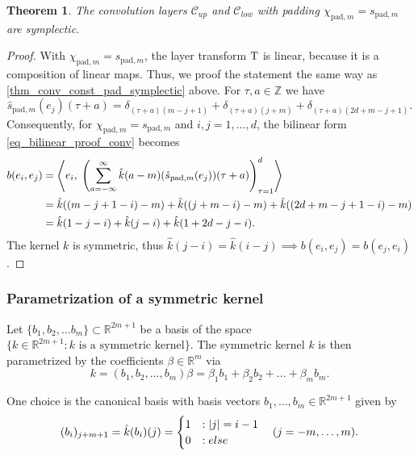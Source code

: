 \documentclass[twoside,a4paper]{article}
\newtheorem{theorem}{Theorem}
\begin{document}
\begin{theorem}
	The convolution layers $\mathcal{C}_{up}$ and $\mathcal{C}_{low}$
	with padding $\chi_{\text{pad},m} = s_{\text{pad},m}$ are symplectic.
\end{theorem}
\begin{proof}
	With $\chi_{\text{pad},m} = s_{\text{pad},m}$, the layer transform 
	$\mathrm{T}$ is linear, because it is a composition of linear maps. Thus,
	we proof the statement the same way as \cref{thm_conv_const_pad_symplectic} above.
	For $\tau,a \in \mathbb{Z}$ we have
	\begin{equation*}
		\hat{s}_{\text{pad},m}(e_j)(\tau + a) = 
		\delta_{(\tau + a) (m-j+1)} + \delta_{(\tau + a) (j+m)} + \delta_{(\tau + a) (2d+m-j+1)}
		.
	\end{equation*}
	Consequently, for $\chi_{\text{pad},m} = s_{\text{pad},m}$ and $i,j=1, \dots, d$, 
	the bilinear form \cref{eq_bilinear_proof_conv} becomes
	\begin{align*}
		b(e_i, e_j) &= \left\langle e_i,\; 
			\left( \sum_{a=-\infty}^{\infty} 
				\hat{k}(a-m)
				(\hat{s}_{\text{pad},m}(e_j))(\tau+a)
			\right)_{\tau=1}^d
		 \right\rangle \\
		&= \hat{k}((m-j+1-i)-m) + \hat{k}((j+m-i)-m) + \hat{k}((2d+m-j+1-i)-m) \\
		&= \hat{k}(1-j-i) + \hat{k}(j-i) + \hat{k}(1+2d-j-i)
		.
	\end{align*}
	The kernel $k$ is symmetric, thus $\hat{k}(j-i) = \hat{k}(i-j) \implies b(e_i, e_j) = b(e_j,e_i)$.
\end{proof}

\subsubsection{Parametrization of a symmetric kernel}\label{sec_param_symmetric_kernel}

Let $\{b_1, b_2, \dots b_m \} \subset \mathbb{R}^{2m+1}$ be a basis of the space 
$\{ k \in \mathbb{R}^{2m+1} : k \text{ is a symmetric kernel} \}$.
The symmetric kernel $k$ is then parametrized by the coefficients $\beta \in \mathbb{R}^m$ via
\begin{equation*}
	k = (b_1, b_2, \dots, b_m) \beta = \beta_1 b_1 + \beta_2 b_2 + \dots + \beta_m b_m
	.
\end{equation*}

One choice is the canonical basis with basis vectors $b_1, \dots, b_m \in \mathbb{R}^{2m+1}$ given by
\begin{equation*}
	(b_i)_{j+m+1} = \hat{k}(b_i)(j) = \begin{cases}
		1 &: \left|{j}\right| = i-1 \\
		0 &:else
	\end{cases} 
	\quad (j=-m, \dots, m)
	.
\end{equation*}
\end{document}
